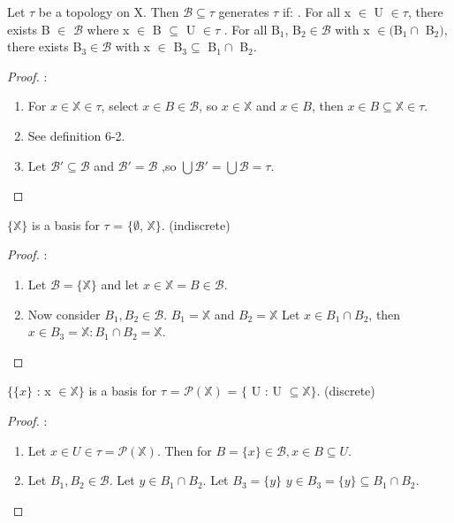 \documentclass{article}
\begin{document}
	\begin{theorem}
	Let $\tau$ be a topology on X. Then $\mathcal{B} \subseteq \tau$ generates $\tau$ if:
	. For all x $\in$ U $\in \tau$, there exists B $\in$ $\mathcal{B}$ where x $\in$ B $\subseteq$ U $\in \tau$
	. For all B$_1$, B$_2 \in \mathcal{B}$ with x $\in ($B$_1 \cap$ B$_2)$, there exists B$_3 \in \mathcal{B}$ with x $\in$ B$_3 \subseteq$ B$_1 \cap$ B$_2$.
\end{theorem}
\begin{proof}:\newline
	\begin{enumerate}
		\item For $x \in \mathbb{X} \in \tau$, select $x \in B \in \mathcal{B}$, so $x \in \mathbb{X}$ and $x \in B$, then $x \in B \subseteq \mathbb{X} \in \tau$.
		\item See definition 6-2.
		\item Let $\mathcal{B'} \subseteq \mathcal{B}$ and $\mathcal{B'} = \mathcal{B}$ ,so $\bigcup \mathcal{B'} = \bigcup \mathcal{B} = \tau$.
	\end{enumerate}
\end{proof}

	\begin{theorem}
	$\lbrace\mathbb{X}\rbrace$ is a basis for $\tau$ = $\lbrace\emptyset$, $\mathbb{X}\rbrace$. (indiscrete)
	\end{theorem}
	\begin{proof}:\newline
	\begin{enumerate}
		\item Let $\mathcal{B} = \lbrace\mathbb{X}\rbrace$ and let $x \in \mathbb{X} = B \in \mathcal{B}$.
		\item Now consider $B_1, B_2 \in \mathcal{B}$. $B_1 = \mathbb{X}$ and $B_2 = \mathbb{X}$ Let $x \in B_1 \cap B_2$, then $x \in B_3 = \mathbb{X} : B_1 \cap B_2 = \mathbb{X}$.
	\end{enumerate}
	\end{proof}

	\begin{theorem}
	$\lbrace\lbrace x \rbrace$ : x $\in \mathbb{X}\rbrace$ is a basis for $\tau$ = $\mathcal{P}(\mathbb{X})$ = $\lbrace$ U : U $\subseteq \mathbb{X} \rbrace$. (discrete)
	\end{theorem}
	\begin{proof}:\newline
		\begin{enumerate}
			\item Let $x \in U \in \tau = \mathcal{P}(\mathbb{X})$. Then for $B = \lbrace x \rbrace \in \mathcal{B}, x \in B \subseteq U$.
			\item Let $B_1, B_2 \in \mathcal{B}$. Let $y \in B_1 \cap B_2$. Let $B_3 = \lbrace y \rbrace$ $y \in B_3 = \lbrace y \rbrace \subseteq B_1 \cap B_2$. 
		\end{enumerate}
	\end{proof}
\end{document}

